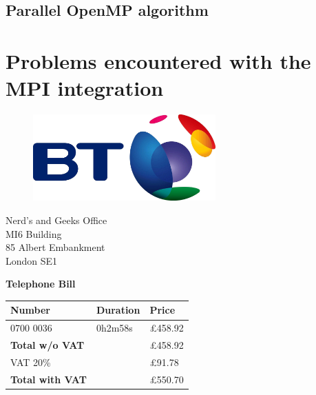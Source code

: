 \documentclass[11pt,a4paper]{article}
\begin{document}
\subsection{Parallel OpenMP algorithm}

\newpage

\appendix
\section*{Problems encountered with the MPI integration}

\newpage

\begin{figure}[!h]
\includegraphics[width=7cm]{bt.jpg}
\end{figure}

\raggedleft
Nerd's and Geeks Office\\
MI6 Building\\
85 Albert Embankment\\
London SE1\\

\raggedright
\vspace{1cm}
\Huge{\textbf{Telephone Bill}}

\vspace{1cm}

\normalsize

\begin{tabularx}{\textwidth}{X X X}
  Number & Duration & Price \\
  \hline
  0700 0036 & 0h2m58s & \pounds458.92 \\
  \hline
  \textbf{Total w/o VAT} &  & \pounds458.92 \\
  \hline
  VAT 20\% & & \pounds91.78 \\
  \hline
  \textbf{Total with VAT} & & \pounds550.70 \\
\end{tabularx}
\end{document}
